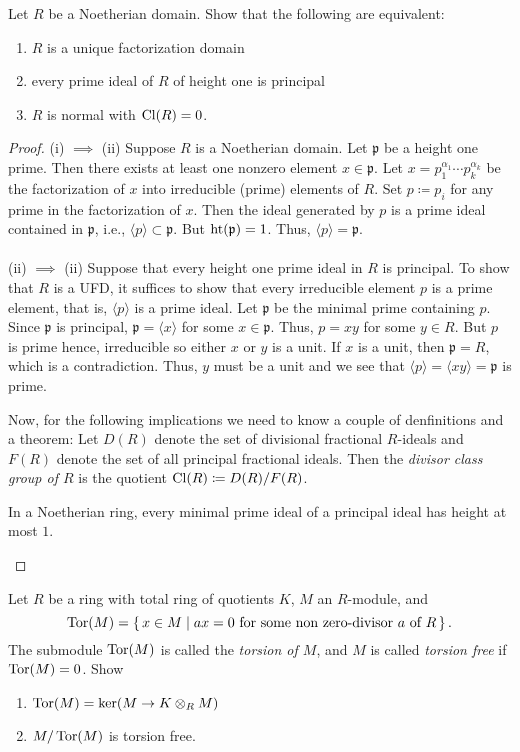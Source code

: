 \begin{problem}
Let $R$ be a Noetherian domain. Show that the following are equivalent:
\begin{enumerate}[label=(\roman*)]
\item $R$ is a unique factorization domain
\item every prime ideal of $R$ of height one is principal
\item $R$ is normal with $\operatorname{Cl}(R)=0$.
\end{enumerate}
\end{problem}
\begin{proof}
(i) $\implies$ (ii) Suppose $R$ is a Noetherian domain. Let $\mathfrak{p}$
be a height one prime. Then there exists at least one nonzero element
$x\in\mathfrak{p}$. Let $x=p_1^{\alpha_1}\cdots p_k^{\alpha_k}$ be the
factorization of $x$ into irreducible (prime) elements of $R$. Set
$p\coloneqq p_i$ for any prime in the factorization of $x$. Then the ideal
generated by $p$ is a prime ideal contained in $\mathfrak{p}$, i.e.,
$\langle p \rangle\subset\mathfrak{p}$. But $\operatorname{ht}(\mathfrak{p})=1$. Thus,
$\langle p \rangle=\mathfrak{p}$.
\\\\
(ii) $\implies$ (ii) Suppose that every height one prime ideal in $R$ is
principal. To show that $R$ is a UFD, it suffices to show that every
irreducible element $p$ is a prime element, that is, $\langle p\rangle$ is
a prime ideal. Let $\mathfrak{p}$ be the minimal prime containing
$p$. Since $\mathfrak{p}$ is principal, $\mathfrak{p}=\langle x\rangle$ for
some $x\in\mathfrak{p}$. Thus, $p=xy$ for some $y\in R$. But $p$ is prime
hence, irreducible so either $x$ or $y$ is a unit. If $x$ is a unit, then
$\mathfrak{p}=R$, which is a contradiction. Thus, $y$ must be a unit and we
see that $\langle p\rangle=\langle xy\rangle=\mathfrak{p}$ is
prime.

Now, for the following implications we need to know a couple of
denfinitions and a theorem: Let $D(R)$ denote the set of divisional
fractional $R$-ideals and $F(R)$ denote the set of all principal fractional
ideals. Then the \emph{divisor class group of $R$} is the quotient
$\operatorname{Cl}(R)\coloneqq D(R)/F(R)$.
\begin{theorem*}
In a Noetherian ring, every minimal prime ideal of a principal ideal has
height at most $1$.
\end{theorem*}
\end{proof}
\newpage
\begin{problem}
Let $R$ be a ring with total ring of quotients $K$, $M$ an $R$-module, and
\[
\operatorname{Tor}(M)=
\left\{\,x\in M\;\middle|\;
\text{$ax=0$ for some non zero-divisor $a$ of $R$}\,\right\}.
\]
The submodule $\operatorname{Tor}(M)$ is called the \emph{torsion of $M$}, and $M$
is called \emph{torsion free} if $\operatorname{Tor}(M)=0$. Show
\begin{enumerate}[label=(\alph*)]
\item $\operatorname{Tor}(M)=\ker(M\to K\otimes_R M)$
\item $M/\operatorname{Tor}(M)$ is torsion free.
\end{enumerate}
\end{problem}

